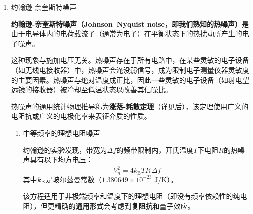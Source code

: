 \documentclass[dvipsnames, svgnames,a4paper,11pt]{article}
\begin{document}

	\begin{enumerate}
		\item 约翰逊-奈奎斯特噪声
		
		\textbf{约翰逊-奈奎斯特噪声（Johnson–Nyquist noise，即我们熟知的热噪声）}是由于电导体内的电荷载流子（通常为电子）在平衡状态下的热扰动所产生的电子噪声。
		
		这种现象与施加电压无关。热噪声存在于所有电路中，在某些灵敏的电子设备（如无线电接收器）中，热噪声会淹没弱信号，成为限制电子测量仪器灵敏度的主要因素。热噪声与绝对温度成正比，因此一些灵敏的电子设备（如射电望远镜的接收器）被冷却至低温状态以改善其信噪比。
		
		热噪声的通用统计物理推导称为\textbf{涨落-耗散定理}（详见后），该定理使用广义的电阻抗或广义的电极化率来表征介质的性质。
		
		
		
		\begin{enumerate}
			\item 中等频率的理想电阻噪声
			
			约翰逊的实验发现，带宽为$\Delta f$的频带限制内，开氏温度$T$下电阻$R$的热噪声具有以下均方电压：
				$$
					\overline {V_n^2} = 4 k_\text{B} T R \, \Delta f
				$$
				其中$k_{\rm B}$是玻尔兹曼常数（$1.380649 \times 10^{-23}$ J/K）。

			该方程适用于非极端频率和温度下的理想电阻（即没有频率依赖性的纯电阻），但更精确的\textbf{通用形式}会考虑到\textbf{复阻抗}和量子效应。
			

\end{enumerate}
\end{enumerate}
\end{document}
